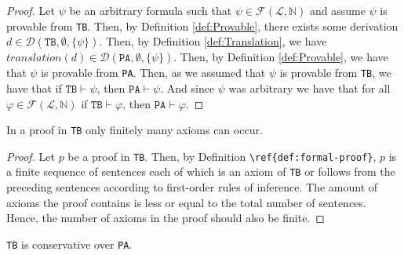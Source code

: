 \begin{proof}
    Let $\psi$ be an arbitrary formula such that $\psi \in \mathcal{F}(\mathcal{L},\mathbb{N})$ and assume $\psi$ is provable from \texttt{TB}. Then, by Definition \ref{def:Provable}, there exists some derivation $d \in \mathcal{D}(\texttt{TB},\emptyset,\{\psi\})$. Then, by Definition \ref{def:Translation}, we have $translation(d) \in \mathcal{D}(\texttt{PA},\emptyset,\{\psi\})$. Then, by Definition \ref{def:Provable}, we have that $\psi$ is provable from \texttt{PA}. Then, as we assumed that $\psi$ is provable from \texttt{TB}, we have that if $\texttt{TB} \vdash \psi$, then $\texttt{PA} \vdash \psi$. And since $\psi$ was arbitrary we have that for all $\varphi \in \mathcal{F}(\mathcal{L}, \mathbb{N})$ if $\texttt{TB} \vdash \varphi$, then $\texttt{PA} \vdash \varphi$.
\end{proof}

\begin{lemma}
    In a proof in \texttt{TB} only finitely many axioms can occur.
\end{lemma}

\begin{proof}
    Let $p$ be a proof in \texttt{TB}. Then, by Definition \verb|\ref{def:formal-proof}|, $p$ is a finite sequence of sentences each of which is an axiom of \texttt{TB} or follows from the preceding sentences according to first-order rules of inference. The amount of axioms the proof contains is less or equal to the total number of sentences. Hence, the number of axioms in the proof should also be finite. 
\end{proof}

\begin{theorem}
    \texttt{TB} is conservative over \texttt{PA}.
\end{theorem}

